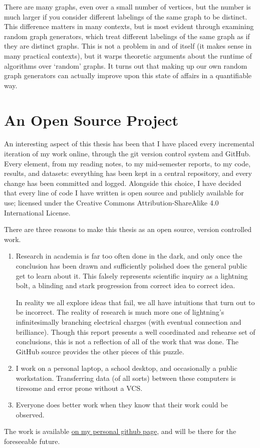 There are many graphs, even over a small number of vertices, but the number is much larger if you consider different labelings of the same graph to be distinct.
This difference matters in many contexts, but is most evident through examining random graph generators, which treat different labelings of the same graph as if they are distinct graphs. 
This is not a problem in and of itself (it makes sense in many practical contexts), but it warps theoretic arguments about the runtime of algorithms over `random' graphs.
It turns out that making up our own random graph generators can actually improve upon this state of affairs in a quantifiable way.

\chapter*{An Open Source Project}

An interesting aspect of this thesis has been that I have placed every incremental iteration of my work online, through the git version control system and GitHub.
Every element, from my reading notes, to my mid-semester reports, to my code, results, and datasets: everything has been kept in a central repository, and every change has been committed and logged.
Alongside this choice, I have decided that every line of code I have written is open source and publicly available for use; licensed under the Creative Commons Attribution-ShareAlike 4.0 International License.

There are three reasons to make this thesis as an open source, version controlled work.
\begin{enumerate}
\item{
Research in academia is far too often done in the dark, and only once the conclusion has been drawn and sufficiently polished does the general public get to learn about it. 
This falsely represents scientific inquiry as a lightning bolt, a blinding and stark progression from correct idea to correct idea. 

In reality we all explore ideas that fail, we all have intuitions that turn out to be incorrect.
The reality of research is much more one of lightning's infinitesimally branching electrical charges (with eventual connection and brilliance). Though this report presents a well coordinated and rehearse set of conclusions, this is not a reflection of all of the work that was done. The GitHub source provides the other pieces of this puzzle.
}
\item{I work on a personal laptop, a school desktop, and occasionally a public workstation. Transferring data (of all sorts) between these computers is tiresome and error prone without a VCS.}
\item{Everyone does better work when they know that their work could be observed.}
\end{enumerate}

The work is available \href{http://www.github.com/gbdubs/thesis}{on my personal github page}, and will be there for the foreseeable future.